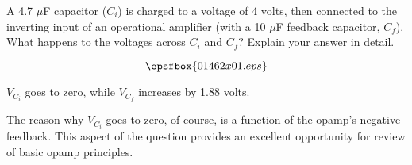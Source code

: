 

A 4.7 $\mu$F capacitor ($C_i$) is charged to a voltage of 4 volts, then connected to the inverting input of an operational amplifier (with a 10 $\mu$F feedback capacitor, $C_f$).  What happens to the voltages across $C_i$ and $C_f$?  Explain your answer in detail.

$$\epsfbox{01462x01.eps}$$







$V_{C_i}$ goes to zero, while $V_{C_{f}}$ increases by 1.88 volts.







The reason why $V_{C_i}$ goes to zero, of course, is a function of the opamp's negative feedback.  This aspect of the question provides an excellent opportunity for review of basic opamp principles.




